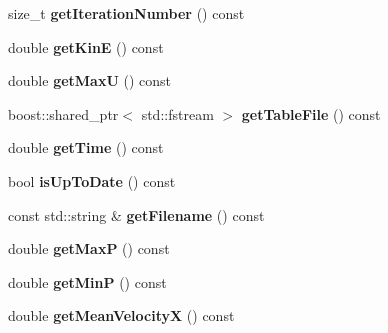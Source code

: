 \begin{DoxyCompactItemize}
\item 
\hypertarget{classnatrium_1_1SolverStats_acf824edde9e155f0c19c591179fed5eb}{
size\_\-t {\bfseries getIterationNumber} () const }
\label{classnatrium_1_1SolverStats_acf824edde9e155f0c19c591179fed5eb}

\item 
\hypertarget{classnatrium_1_1SolverStats_a24d2637fa64a779c0f01820ae7e0dfa6}{
double {\bfseries getKinE} () const }
\label{classnatrium_1_1SolverStats_a24d2637fa64a779c0f01820ae7e0dfa6}

\item 
\hypertarget{classnatrium_1_1SolverStats_ac880e86e2e93cafad88fa447ebb641b5}{
double {\bfseries getMaxU} () const }
\label{classnatrium_1_1SolverStats_ac880e86e2e93cafad88fa447ebb641b5}

\item 
\hypertarget{classnatrium_1_1SolverStats_ac1663800fe3d597f2727f0d938641381}{
boost::shared\_\-ptr$<$ std::fstream $>$ {\bfseries getTableFile} () const }
\label{classnatrium_1_1SolverStats_ac1663800fe3d597f2727f0d938641381}

\item 
\hypertarget{classnatrium_1_1SolverStats_a7eb7473ffe34d624bb8c09666021a6e8}{
double {\bfseries getTime} () const }
\label{classnatrium_1_1SolverStats_a7eb7473ffe34d624bb8c09666021a6e8}

\item 
\hypertarget{classnatrium_1_1SolverStats_ade0d711e048a834547ad32643bc2b529}{
bool {\bfseries isUpToDate} () const }
\label{classnatrium_1_1SolverStats_ade0d711e048a834547ad32643bc2b529}

\item 
\hypertarget{classnatrium_1_1SolverStats_aedf3ce8027cba3da15c8b28241234c94}{
const std::string \& {\bfseries getFilename} () const }
\label{classnatrium_1_1SolverStats_aedf3ce8027cba3da15c8b28241234c94}

\item 
\hypertarget{classnatrium_1_1SolverStats_a101f0b150f9bf2bf48ae6c4031f4c270}{
double {\bfseries getMaxP} () const }
\label{classnatrium_1_1SolverStats_a101f0b150f9bf2bf48ae6c4031f4c270}

\item 
\hypertarget{classnatrium_1_1SolverStats_a582de4d3fd470f78c03cada1c8ebf959}{
double {\bfseries getMinP} () const }
\label{classnatrium_1_1SolverStats_a582de4d3fd470f78c03cada1c8ebf959}

\item 
\hypertarget{classnatrium_1_1SolverStats_a331dab963d64362612b3378fc9588894}{
double {\bfseries getMeanVelocityX} () const }
\label{classnatrium_1_1SolverStats_a331dab963d64362612b3378fc9588894}

\end{DoxyCompactItemize}


